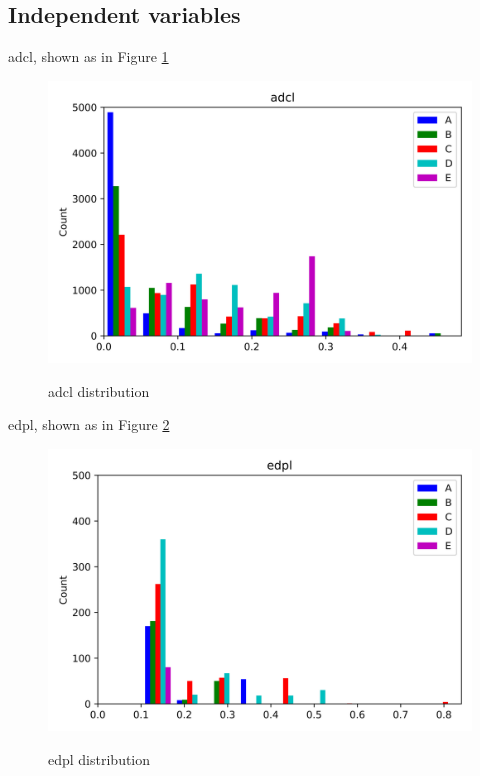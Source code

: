 \documentclass{article}
\begin{document}
\subsection{Independent variables}

adcl, shown as in Figure \ref{adcl} \par
\begin{figure}[H]
	\centering
	\includegraphics[width=\textwidth, keepaspectratio]{adcl.png}\\
	\caption{adcl distribution}
	\label{adcl}
\end{figure}



edpl, shown as in Figure \ref{edpl} \par
\begin{figure}[H]
	\centering
	\includegraphics[width=\textwidth, keepaspectratio]{edpl.png}\\
	\caption{edpl distribution}
	\label{edpl}
\end{figure}
\end{document}
